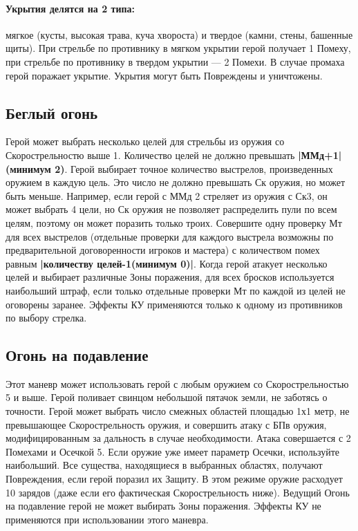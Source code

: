 \paragraph{Укрытия делятся на 2 типа:} мягкое (кусты, высокая трава, куча хвороста) и твердое (камни, стены, башенные щиты). При стрельбе по противнику в мягком укрытии герой получает 1 Помеху, при стрельбе по противнику в твердом укрытии — 2 Помехи. В случае промаха герой поражает укрытие. Укрытия могут быть Повреждены и уничтожены.
\subsection{Беглый огонь}
Герой может выбрать несколько целей для стрельбы из оружия со Скорострельностю выше 1. Количество целей не должно превышать \textbf{|ММд+1|(минимум 2)}. Герой выбирает точное количество выстрелов, произведенных оружием в каждую цель. Это число не должно превышать Ск оружия, но может быть меньше. Например, если герой с ММд 2 стреляет из оружия с Ск3, он может выбрать 4 цели, но Ск оружия не позволяет распределить пули по всем целям, поэтому он может поразить только троих.
\newline
Совершите одну проверку Мт для всех выстрелов (отдельные проверки для каждого выстрела возможны по предварительной договоренности игроков и мастера) с количеством помех равным \textbf{|количеству целей-1(минимум 0)|}. Когда герой атакует несколько целей и выбирает различные Зоны поражения, для всех бросков используется наибольший штраф, если только отдельные проверки Мт по каждой из целей не оговорены заранее.
\newline
Эффекты КУ применяются только к одному из противников по выбору стрелка.
\subsection{Огонь на подавление}
Этот маневр может использовать герой с любым оружием со Скорострельностью 5 и выше. Герой поливает свинцом небольшой пятачок земли, не заботясь о точности. Герой может выбрать число смежных областей площадью 1х1 метр, не превышающее Скорострельность оружия, и совершить атаку с БПв оружия, модифицированным за дальность в случае необходимости. Атака совершается с 2 Помехами и Осечкой 5. Если оружие уже имеет параметр Осечки, используйте наибольший. Все существа, находящиеся в выбранных областях, получают Повреждения, если герой поразил их Защиту. В этом режиме оружие расходует 10 зарядов (даже если его фактическая Скорострельность ниже). Ведущий Огонь на подавление герой не может выбирать Зоны поражения.
\newline
Эффекты КУ не применяются при использовании этого маневра.